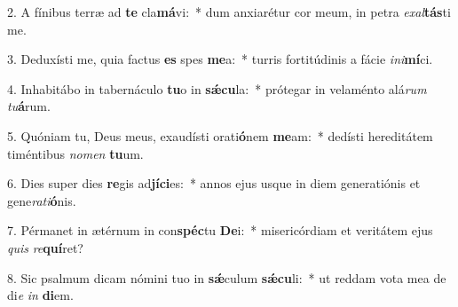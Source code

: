 2. A fínibus terræ ad \textbf{te} cla\textbf{má}vi:~*  dum anxiarétur cor meum, in petra \textit{ex}\textit{al}\textbf{tás}ti me.\

3. Deduxísti me, quia factus \textbf{es} spes \textbf{me}a:~*  turris fortitúdinis a fácie \textit{in}\textit{i}\textbf{mí}ci.\

4. Inhabitábo in tabernáculo \textbf{tu}o in \textbf{sǽ}\textbf{cu}la:~*  prótegar in velaménto alá\textit{rum} \textit{tu}\textbf{á}rum.\

5. Quóniam tu, Deus meus, exaudísti orati\textbf{ó}nem \textbf{me}am:~*  dedísti hereditátem timéntibus \textit{no}\textit{men} \textbf{tu}um.\

6. Dies super dies \textbf{re}gis ad\textbf{jí}\textbf{ci}es:~*  annos ejus usque in diem generatiónis et gene\textit{ra}\textit{ti}\textbf{ó}nis.\

7. Pérmanet in ætérnum in con\textbf{spéc}tu \textbf{De}i:~*  misericórdiam et veritátem ejus \textit{quis} \textit{re}\textbf{quí}ret?\

8. Sic psalmum dicam nómini tuo in \textbf{sǽ}culum \textbf{sǽ}\textbf{cu}li:~*  ut reddam vota mea de di\textit{e} \textit{in} \textbf{di}em.\

